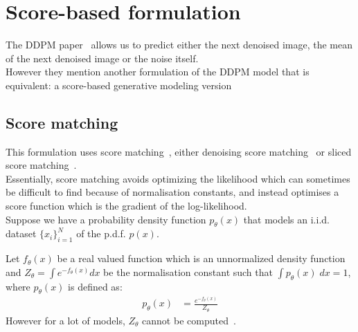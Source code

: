 \documentclass[twoside]{article}
\numberwithin{equation}{section}
\numberwithin{figure}{section}
\begin{document}
\section{Score-based formulation}
The DDPM paper~\cite{ho2020denoising} allows us to predict either the next denoised image, the mean of the next denoised image or the noise itself. \\
However they mention another formulation of the DDPM model that is equivalent: a score-based generative modeling version
\subsection{Score matching}
This formulation uses score matching~\cite{hyvarinen2005}, either denoising score matching~\cite{vincent2010denoising} or sliced score matching~\cite{song2019sliced}. \\
Essentially, score matching avoids optimizing the likelihood which can sometimes be difficult to find because of normalisation constants, and instead optimises a score function which is the gradient of the log-likelihood. \\
Suppose we have a probability density function $p_\theta (x)$ that models an i.i.d. dataset $\{x_i\}_{i=1}^N$ of the p.d.f. $p(x)$. 

Let $f_\theta (x)$ be a real valued function which is an unnormalized density function and $Z_\theta = \int e^{-f_\theta (x)} dx$ be the normalisation constant such that $\int p_\theta (x) \; dx = 1$, where $p_\theta(x)$ is defined as:
\begin{align}
  p_\theta (x) &= \frac{e^{-f_\theta (x)}}{Z_\theta}
\end{align}
However for a lot of models, $Z_\theta$ cannot be computed~\cite{luo2022understanding}. \\
\end{document}
